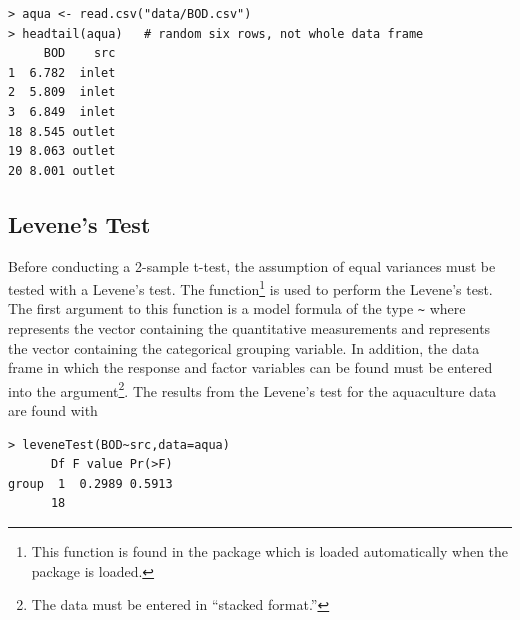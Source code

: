 \documentclass[10pt,openany]{book}\usepackage[]{graphicx}\usepackage[]{color}
\makeatletter
\newenvironment{kframe}{%
 \def\at@end@of@kframe{}%
 \ifinner\ifhmode%
  \def\at@end@of@kframe{\end{minipage}}%
  \begin{minipage}{\columnwidth}%
 \fi\fi%
 \def\FrameCommand##1{\hskip\@totalleftmargin \hskip-\fboxsep
 \colorbox{shadecolor}{##1}\hskip-\fboxsep
     \hskip-\linewidth \hskip-\@totalleftmargin \hskip\columnwidth}%
 \MakeFramed {\advance\hsize-\width
   \@totalleftmargin\z@ \linewidth\hsize
   \@setminipage}}%
 {\par\unskip\endMakeFramed%
 \at@end@of@kframe}
\newenvironment{knitrout}{}{} %
\makeatother
\begin{document}
\begin{knitrout}
\color{fgcolor}\begin{kframe}
\begin{verbatim}
> aqua <- read.csv("data/BOD.csv")
> headtail(aqua)   # random six rows, not whole data frame
     BOD    src
1  6.782  inlet
2  5.809  inlet
3  6.849  inlet
18 8.545 outlet
19 8.063 outlet
20 8.001 outlet
\end{verbatim}
\end{kframe}
\end{knitrout}


\vspace{-12pt}

\subsection{Levene's Test}
Before conducting a 2-sample t-test, the assumption of equal variances must be tested with a Levene's test.  The  function\footnote{This function is found in the  package which is loaded automatically when the  package is loaded.} is used to perform the Levene's test.  The first argument to this function is a model formula of the type \verb"~" where  represents the vector containing the quantitative measurements and  represents the vector containing the categorical grouping variable.  In addition, the data frame in which the response and factor variables can be found must be entered into the  argument\footnote{The data must be entered in ``stacked format.''}.  The results from the Levene's test for the aquaculture data are found with

\begin{knitrout}
\color{fgcolor}\begin{kframe}
\begin{verbatim}
> leveneTest(BOD~src,data=aqua)
      Df F value Pr(>F)
group  1  0.2989 0.5913
      18               
\end{verbatim}
\end{kframe}
\end{knitrout}
\end{document}
